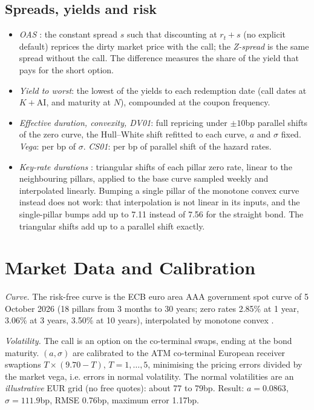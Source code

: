 \documentclass[11pt,a4paper]{article}
\newcommand{\AI}{\mathrm{AI}}
\begin{document}
\subsection{Spreads, yields and risk}
\begin{itemize}
\item \emph{OAS} \cite{kalotay1993}: the constant spread $s$ such that discounting at $r_t + s$ (no explicit default)
reprices the dirty market price with the call; the \emph{Z-spread} is the same spread without the call. The
difference measures the share of the yield that pays for the short option.
\item \emph{Yield to worst}: the lowest of the yields to each redemption date (call dates at $K + \AI$, and maturity
at $N$), compounded at the coupon frequency.
\item \emph{Effective duration, convexity, DV01}: full repricing under $\pm 10$bp parallel shifts of the zero curve,
the Hull--White shift refitted to each curve, $a$ and $\sigma$ fixed. \emph{Vega}: per bp of $\sigma$.
\emph{CS01}: per bp of parallel shift of the hazard rates.
\item \emph{Key-rate durations} \cite{ho1992}: triangular shifts of each pillar zero rate, linear to the neighbouring
pillars, applied to the base curve sampled weekly and interpolated linearly. Bumping a single pillar of the
monotone convex curve instead does not work: that interpolation is not linear in its inputs, and the single-pillar
bumps add up to 7.11 instead of 7.56 for the straight bond. The triangular shifts add up to a parallel shift exactly.
\end{itemize}

\section{Market Data and Calibration}\label{sec:data}
\emph{Curve.} The risk-free curve is the ECB euro area AAA government spot curve of 5 October 2026 (18 pillars from
3 months to 30 years; zero rates 2.85\% at 1 year, 3.06\% at 3 years, 3.50\% at 10 years), interpolated by monotone
convex \cite{benguedda2026yield}.

\emph{Volatility.} The call is an option on the co-terminal swaps, ending at the bond maturity. $(a, \sigma)$ are
calibrated to the ATM co-terminal European receiver swaptions $T \times (9.70 - T)$, $T = 1,\dots,5$, minimising the
pricing errors divided by the market vega, i.e. errors in normal volatility. The normal volatilities are an
\emph{illustrative} EUR grid (no free quotes): about 77 to 79bp. Result: $a = 0.0863$, $\sigma = 111.9$bp, RMSE
0.76bp, maximum error 1.17bp.
\end{document}
